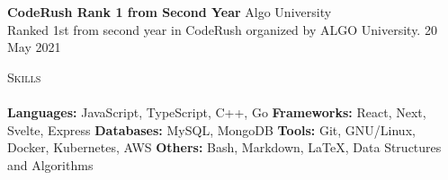 \documentclass[a4paper]{article}
\newcommand{\lineunder} {
    \vspace*{-8pt} \\
    \hspace*{-18pt} \hrulefill \\
}
\newcommand{\header} [1] {
    {\hspace*{-18pt}\vspace*{6pt} \textsc{#1}}
    \vspace*{-6pt} \lineunder
}
\begin{document}
\textbf{CodeRush Rank 1 from Second Year} \hfill Algo University\\
Ranked 1st from second year in CodeRush organized by ALGO University. \hfill 20 May 2021\\
\vspace*{1.5mm}



\header{Skills}
\vspace{1mm}
\textbf{Languages:} JavaScript, TypeScript, C++, Go
\quad \textbf{Frameworks:} React, Next, Svelte, Express
\quad \textbf{Databases:} MySQL, MongoDB
\quad \textbf{Tools:} Git, GNU/Linux, Docker, Kubernetes, AWS
\quad \textbf{Others:} Bash, Markdown, \LaTeX, Data Structures and Algorithms
\vspace{1.5mm}
\end{document}
